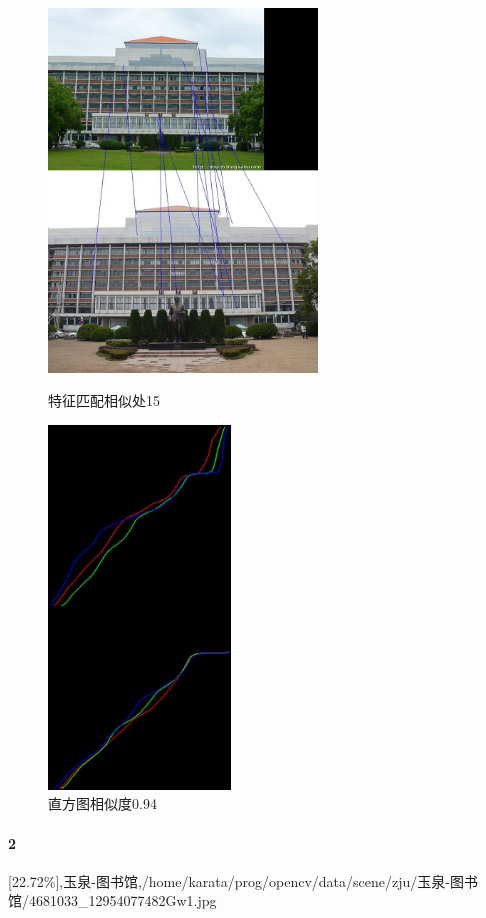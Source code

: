 \begin{figure}[htb]
\begin{minipage}[t]{0.5\linewidth}
\centering
\includegraphics[height=3.8in]{玉泉图书馆.jpg.d/im1sift.jpg}
\caption{特征匹配相似处15}
\label{fig:side:a}
\end{minipage}%
\begin{minipage}[t]{0.5\linewidth}
\centering
\includegraphics[height=3.8in]{玉泉图书馆.jpg.d/im1hist2.jpg}
\caption{直方图相似度0.94}
\label{fig:side:a}
\end{minipage}%
\end{figure}

\clearpage
\paragraph{2}
[22.72\%],玉泉-图书馆,/home/karata/prog/opencv/data/scene/zju/玉泉-图书馆/4681033\_12954077482Gw1.jpg

